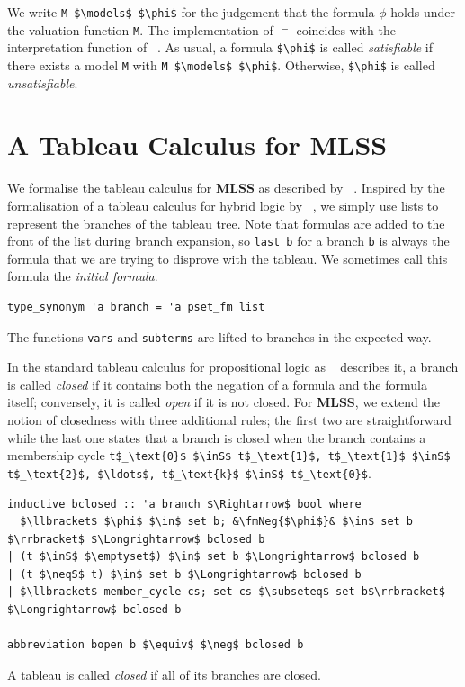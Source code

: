 \documentclass[runningheads]{llncs}
\newcommand{\MLSS}{\textbf{MLSS}}
\newcommand{\inS}{\in_\text{s}}
\newcommand{\neqS}{\neq_\text{s}}
\newcommand{\fmNegSymbol}{\boldsymbol{\neg}}
\newcommand{\fmNeg}[1]{$\fmNegSymbol\:$#1}
\begin{document}
We write \lstinline!M $\models$ $\phi$! for the judgement that the formula $\phi$ holds under the valuation function \lstinline!M!.
The implementation of $\models$ coincides with the interpretation function of \citeauthor{lqe}~\cite{lqe}.
As usual, a formula \lstinline!$\phi$! is called \emph{satisfiable} if there exists a model \lstinline!M! with \lstinline!M $\models$ $\phi$!.
Otherwise, \lstinline!$\phi$! is called \emph{unsatisfiable}.

\section{A Tableau Calculus for MLSS}
We formalise the tableau calculus for \MLSS{} as described by \citeauthor{new_fast_tableau}~\cite{new_fast_tableau}.
Inspired by the formalisation of a tableau calculus for hybrid logic by \citeauthor{hybrid_logic_afp}~\cite{hybrid_logic_afp}, we simply use lists to represent the branches of the tableau tree.
Note that formulas are added to the front of the list during branch expansion, so \lstinline!last b! for a branch \lstinline!b! is always the formula that we are trying to disprove with the tableau.
We sometimes call this formula the \emph{initial formula}.
\begin{lstlisting}
type_synonym 'a branch = 'a pset_fm list
\end{lstlisting}

\noindent The functions \lstinline!vars! and \lstinline!subterms! are lifted to branches in the expected way.

In the standard tableau calculus for propositional logic as \citeauthor{tableau}~\cite{tableau} describes it, a branch is called \emph{closed} if it contains both the negation of a formula and the formula itself;
conversely, it is called \emph{open} if it is not closed.
For \MLSS{}, we extend the notion of closedness with three additional rules; the first two are straightforward while the last one states that a branch is closed when the branch contains a membership cycle
\lstinline!t$_\text{0}$ $\inS$ t$_\text{1}$, t$_\text{1}$ $\inS$ t$_\text{2}$, $\ldots$, t$_\text{k}$ $\inS$ t$_\text{0}$!.

\begin{lstlisting}
inductive bclosed :: 'a branch $\Rightarrow$ bool where
  $\llbracket$ $\phi$ $\in$ set b; &\fmNeg{$\phi$}& $\in$ set b $\rrbracket$ $\Longrightarrow$ bclosed b
| (t $\inS$ $\emptyset$) $\in$ set b $\Longrightarrow$ bclosed b
| (t $\neqS$ t) $\in$ set b $\Longrightarrow$ bclosed b
| $\llbracket$ member_cycle cs; set cs $\subseteq$ set b$\rrbracket$ $\Longrightarrow$ bclosed b

abbreviation bopen b $\equiv$ $\neg$ bclosed b
\end{lstlisting}
A tableau is called \emph{closed} if all of its branches are closed.
\end{document}
